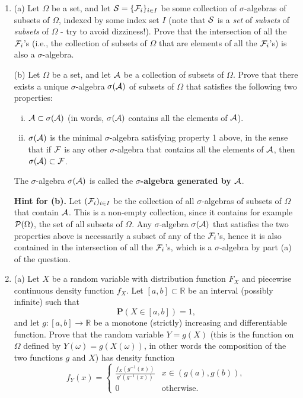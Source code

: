 \documentclass[12pt]{article}
\newcommand{\R}{\mathbb{R}}
\newcommand{\prob}{\mathbf{P}}
\theoremstyle{example}
\begin{document}
\begin{enumerate}
\item
(a) Let $\Omega$ be a set, and let ${\cal S} = \{{\cal F}_i\}_{i\in I}$ be some collection of $\sigma$-algebras of subsets of $\Omega$, indexed by some index set $I$ (note that ${\cal S}$ is a \emph{set} of \emph{subsets} of \emph{subsets} of $\Omega$ - try to avoid dizziness!). Prove that the intersection of all the ${\cal F}_i$'s (i.e., the collection of subsets of $\Omega$ that are elements of all the ${\cal F}_i$'s) is also a $\sigma$-algebra.

\medskip \noindent
(b) Let $\Omega$ be a set, and let ${\cal A}$ be a collection of subsets of $\Omega$. Prove that there exists a unique $\sigma$-algebra $\sigma({\cal A})$ of subsets of $\Omega$ that satisfies the following two properties:
\begin{enumerate}[(i)]
\item ${\cal A} \subset \sigma({\cal A})$ (in words, $\sigma({\cal A})$ contains all the elements of ${\cal A}$).
\item $\sigma({\cal A})$ is the minimal $\sigma$-algebra satisfying property 1 above, in the sense that if ${\cal F}$ is any other $\sigma$-algebra that contains all the elements of ${\cal A}$, then $\sigma({\cal A}) \subset {\cal F}$.
\end{enumerate}
The $\sigma$-algebra $\sigma({\cal A})$ is called the \textbf{$\sigma$-algebra generated by ${\cal A}$}.

\medskip \noindent
\textbf{Hint for (b).} Let $({\cal F}_i)_{i\in I}$ be the collection of all $\sigma$-algebras of subsets of $\Omega$ that contain ${\cal A}$. This is a non-empty collection, since it contains for example ${\cal P}(\Omega)$, the set of all subsets of $\Omega$. Any $\sigma$-algebra $\sigma({\cal A})$ that satisfies the two properties above is necessarily a subset of any of the ${\cal F}_i$'s, hence it is also contained in the intersection of all the ${\cal F}_i$'s, which is a $\sigma$-algebra by part (a) of the question.



\item (a) Let $X$ be a random variable with distribution function $F_X$ and piecewise continuous density function $f_X$. Let $[a,b] \subset \R$ be an interval (possibly infinite) such that
$$ \prob(X \in [a,b]) = 1, $$
and let $g:[a,b]\to\R$ be a monotone (strictly) increasing and differentiable function. Prove that the random variable $Y=g(X)$
(this is the function on $\Omega$ defined by $Y(\omega) = g(X(\omega))$, in other words the composition of the two functions $g$ and $X$) has density function
$$ f_Y(x) = \begin{cases} \frac{f_X(g^{-1}(x))}{g'(g^{-1}(x))} & x\in (g(a),g(b)), \\ 0 & \textrm{otherwise.} \end{cases} $$


\end{enumerate}
\end{document}
